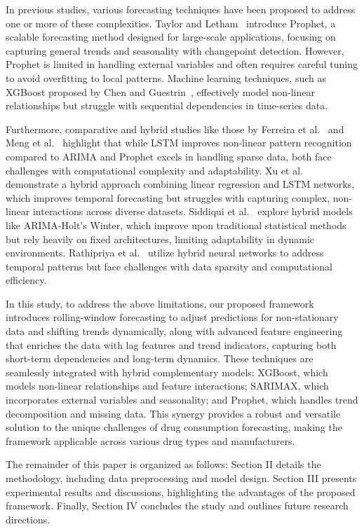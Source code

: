 \documentclass[journal]{IEEEtran}
\begin{document}
In previous studies, various forecasting techniques have been proposed to address one or more of these complexities. Taylor and Letham~\cite{taylor2018forecasting} introduce Prophet, a scalable forecasting method designed for large-scale applications, focusing on capturing general trends and seasonality with changepoint detection. However, Prophet is limited in handling external variables and often requires careful tuning to avoid overfitting to local patterns. Machine learning techniques, such as XGBoost proposed by Chen and Guestrin~\cite{chen2016xgboost}, effectively model non-linear relationships but struggle with sequential dependencies in time-series data. 

Furthermore, comparative and hybrid studies like those by Ferreira et al.~\cite{ferreira2018forecast} and Meng et al.~\cite{meng2021comparative} highlight that while LSTM improves non-linear pattern recognition compared to ARIMA and Prophet excels in handling sparse data, both face challenges with computational complexity and adaptability. Xu et al.~\cite{xu2019hybrid} demonstrate a hybrid approach combining linear regression and LSTM networks, which improves temporal forecasting but struggles with capturing complex, non-linear interactions across diverse datasets. Siddiqui et al.~\cite{siddiqui2021hybrid} explore hybrid models like ARIMA-Holt’s Winter, which improve upon traditional statistical methods but rely heavily on fixed architectures, limiting adaptability in dynamic environments. Rathipriya et al.~\cite{rathipriya2022pharma} utilize hybrid neural networks to address temporal patterns but face challenges with data sparsity and computational efficiency. 

In this study, to address the above limitations, our proposed framework introduces rolling-window forecasting to adjust predictions for non-stationary data and shifting trends dynamically, along with advanced feature engineering that enriches the data with lag features and trend indicators, capturing both short-term dependencies and long-term dynamics. These techniques are seamlessly integrated with hybrid complementary models: XGBoost, which models non-linear relationships and feature interactions; SARIMAX, which incorporates external variables and seasonality; and Prophet, which handles trend decomposition and missing data. This synergy provides a robust and versatile solution to the unique challenges of drug consumption forecasting, making the framework applicable across various drug types and manufacturers.

The remainder of this paper is organized as follows: Section II details the methodology, including data preprocessing and model design. Section III presents experimental results and discussions, highlighting the advantages of the proposed framework. Finally, Section IV concludes the study and outlines future research directions.
\end{document}
